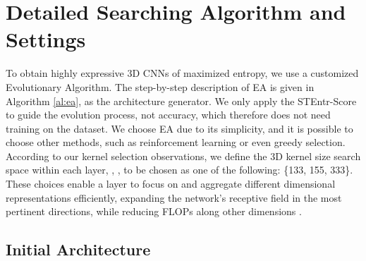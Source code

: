 \documentclass{article} \usepackage{iclr2023_conference,times}
\begin{document}
\section{Detailed Searching Algorithm and Settings}
\label{sec:algorithm}
To obtain highly expressive 3D CNNs of maximized entropy, we use a customized Evolutionary Algorithm. The step-by-step description of EA is given in Algorithm \ref{al:ea}, as the architecture generator.
We only apply the STEntr-Score to guide the evolution process, not accuracy, which therefore does not need training on the dataset.
We choose EA due to its simplicity, and it is possible to choose other methods, such as reinforcement learning or even greedy selection.
According to our kernel selection observations, we define the 3D kernel size search space within each layer, , , to be chosen as one of the following: \{133, 155, 333\}. These choices enable a layer to focus on and aggregate different dimensional representations efficiently, expanding the network’s receptive field in the most pertinent directions, while reducing FLOPs along other dimensions \citep{kondratyuk2021movinets}.


\subsection{Initial Architecture}
\begin{table}[ht]
\centering
    \caption{E3D-S initial searching. ``stage{}" is a super structure which contains ``layers"-layer 3D inverted bottleneck block. Channels means the output channels of the corresponding convolution.}
        \renewcommand\arraystretch{1.05}
        \setlength\tabcolsep{6pt}
        \label{tab:init}
\end{table}
\end{document}
